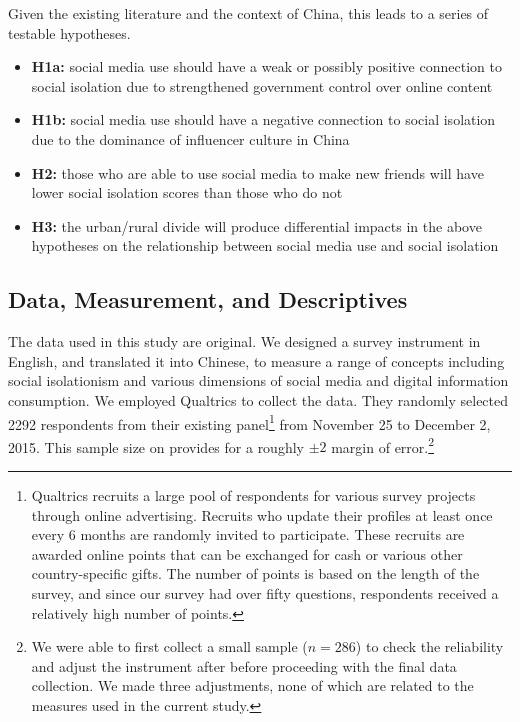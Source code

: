 \documentclass[
  letterpaper,
  DIV=11,
  numbers=noendperiod]{scrartcl}
\begin{document}
Given the existing literature and the context of China, this leads to a
series of testable hypotheses.

\begin{itemize}
\item
  \textbf{H1a:} social media use should have a weak or possibly positive
  connection to social isolation due to strengthened government control
  over online content
\item
  \textbf{H1b:} social media use should have a negative connection to
  social isolation due to the dominance of influencer culture in China
\item
  \textbf{H2:} those who are able to use social media to make new
  friends will have lower social isolation scores than those who do not
\item
  \textbf{H3:} the urban/rural divide will produce differential impacts
  in the above hypotheses on the relationship between social media use
  and social isolation
\end{itemize}

\hypertarget{data-measurement-and-descriptives}{%
\subsection{Data, Measurement, and
Descriptives}\label{data-measurement-and-descriptives}}

The data used in this study are original. We designed a survey
instrument in English, and translated it into Chinese, to measure a
range of concepts including social isolationism and various dimensions
of social media and digital information consumption. We employed
Qualtrics to collect the data. They randomly selected 2292 respondents
from their existing panel\footnote{Qualtrics recruits a large pool of
  respondents for various survey projects through online advertising.
  Recruits who update their profiles at least once every 6 months are
  randomly invited to participate. These recruits are awarded online
  points that can be exchanged for cash or various other
  country-specific gifts. The number of points is based on the length of
  the survey, and since our survey had over fifty questions, respondents
  received a relatively high number of points.} from November 25 to
December 2, 2015. This sample size on provides for a roughly \(\pm2\)
margin of error.\footnote{We were able to first collect a small sample
  (\(n=286\)) to check the reliability and adjust the instrument after
  before proceeding with the final data collection. We made three
  adjustments, none of which are related to the measures used in the
  current study.}
\end{document}
